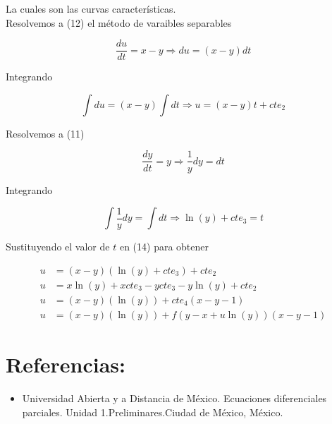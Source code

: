 \documentclass{article}
\begin{document}
\begin{enumerate}
					La cuales son las curvas características.\\
					
					Resolvemos a (12) el método de varaibles separables
						
						\begin{equation*}
							\frac{du}{dt} =x-y \Longrightarrow du=(x-y)dt
						\end{equation*}
					
					Integrando
						
						\begin{equation}
							\int du = (x-y)\int dt \Longrightarrow u=(x-y)t+cte_2
						\end{equation}
					
					Resolvemos a (11) 
						
						\begin{equation*}
							\frac{dy}{dt} =y \Longrightarrow  \frac{1}{y} dy =dt
						\end{equation*}
					
					Integrando
						
						\begin{equation}
							\int \frac{1}{y} dy = \int dt \Longrightarrow \ln (y)+cte_3 =t
						\end{equation}
					
					Sustituyendo el valor de $t$ en (14) para obtener
						
						\begin{align*}
							u&=(x-y)(\ln (y)+cte_3)+cte_2\\
							u&=x\ln (y)+xcte_3-ycte_3 -y\ln (y) +cte_2\\
							u&=(x-y)(\ln(y)) + cte_4(x-y-1)\\
							u&=(x-y)(\ln(y)) + f(y-x+u\ln (y))(x-y-1)
						\end{align*}
					
					\section*{Referencias:}
			
			\begin{itemize}
				\item Universidad Abierta y a Distancia de México. Ecuaciones diferenciales parciales. Unidad 1.Preliminares.Ciudad de México, México.
			\end{itemize}
					
		\end{enumerate}
\end{document}

